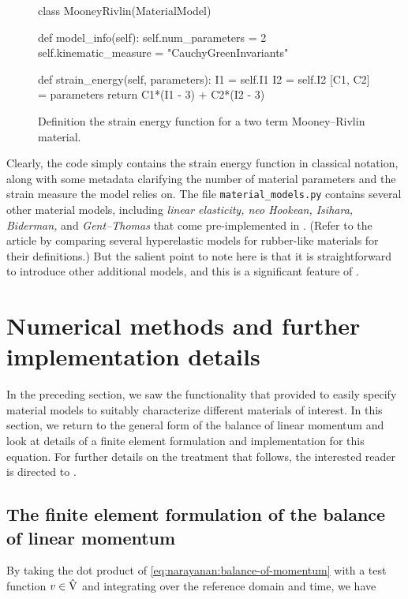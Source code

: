 \begin{figure}[!ht]
\begin{python}
class MooneyRivlin(MaterialModel)

  def model_info(self):
    self.num_parameters = 2
    self.kinematic_measure = "CauchyGreenInvariants"

  def strain_energy(self, parameters):
    I1 = self.I1
    I2 = self.I2
    [C1, C2] = parameters
    return C1*(I1 - 3) + C2*(I2 - 3)
\end{python}
\caption{Definition the strain energy function for a two term
  Mooney--Rivlin material.}
\label{code:narayanan:mr}
\end{figure}

\noindent Clearly, the code simply contains the strain energy function
in classical notation, along with some metadata clarifying the number
of material parameters and the strain measure the model relies on. The
file {\tt material\_models.py} contains several other material models,
including {\em linear elasticity, neo Hookean, Isihara, Biderman,} and
{\em Gent--Thomas} that come pre-implemented in \twist. (Refer to the
article by \citet{MarckmannVerron2006} comparing several hyperelastic
models for rubber-like materials for their definitions.) But the
salient point to note here is that it is straightforward to introduce
other additional models, and this is a significant feature of \twist.

\section{Numerical methods and further implementation details}

In the preceding section, we saw the functionality that \twist{}
provided to easily specify material models to suitably characterize
different materials of interest. In this section, we return to the
general form of the balance of linear momentum and look at details of
a finite element formulation and implementation for this equation. For
further details on the treatment that follows, the interested reader
is directed to \citet{SimoHughes1998}.

\subsection{The finite element formulation of the balance of linear
  momentum}

By taking the dot product of
\eqref{eq:narayanan:balance-of-momentum} with a test function
$\mbox{$ v$} \in \hat{\mathrm{V}}$ and integrating over the reference domain
and time, we have

